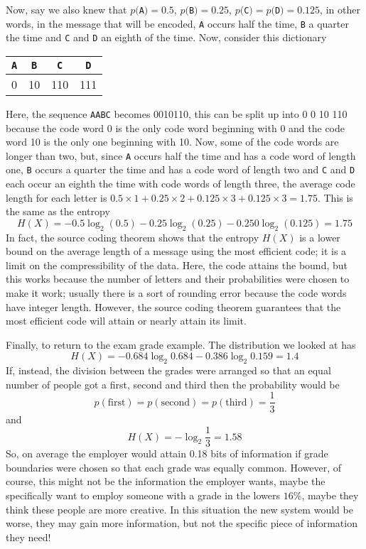 \documentclass[12pt]{article}
\begin{document}
Now, say we also knew that $p($\texttt{A}$)=0.5$, $p($\texttt{B}$)=0.25$,
$p($\texttt{C}$)=p($\texttt{D}$)=0.125$, in other words, in the message that will be
encoded, \texttt{A} occurs half the time, \texttt{B} a quarter the time and \texttt{C} and \texttt{D} an
eighth of the time. Now, consider this dictionary
\begin{center}
\begin{tabular}{cccc}
\texttt{A}&\texttt{B}&\texttt{C}&\texttt{D}\\
\hline
0&10&110&111
\end{tabular}
\end{center}
Here, the sequence \texttt{AABC} becomes 0010110, this can be split up into 0
0 10 110 because the code word 0 is the only code word beginning
with 0 and the code word 10 is the only one beginning with 10. Now,
some of the code words are longer than two, but, since \texttt{A} occurs half
the time and has a code word of length one, \texttt{B} occurs a quarter the
time and has a code word of length two and \texttt{C} and \texttt{D} each occur an
eighth the time with code words of length three, the average code
length for each letter is $0.5\times 1 +0.25\times 2 + 0.125\times 3 +
0.125\times 3=1.75$. This is the same as the entropy
\begin{equation}
H(X)=-0.5\log_2(0.5)-0.25\log_2(0.25)-0.250\log_2(0.125)=1.75
\end{equation}
In fact, the source coding theorem shows that the entropy $H(X)$ is
a lower bound on the average length of a message using the most
efficient code; it is a limit on the compressibility of the
data. Here, the code attains the bound, but this works because the
number of letters and their probabilities were chosen to make it work;
usually there is a sort of rounding error because the code words have
integer length. However, the source coding theorem guarantees that the
most efficient code will attain or nearly attain its limit.

Finally, to return to the exam grade example. The distribution we looked at has
\begin{equation}
H(X)=-0.684\log_2{0.684}-0.386\log_2{0.159}=1.4
\end{equation}
If, instead, the division between the grades were arranged so that an equal number of people got a first, second and third then the probability would be 
\begin{equation}
p(\mbox{first})=p(\mbox{second})=p(\mbox{third})=\frac{1}{3}
\end{equation}
and
\begin{equation}
H(X)=-\log_2\frac{1}{3}=1.58
\end{equation}
So, on average the employer would attain 0.18 bits of information if
grade boundaries were chosen so that each grade was equally
common. However, of course, this might not be the information the
employer wants, maybe the specifically want to employ someone with a
grade in the lowers $16\%$, maybe they think these people are more
creative. In this situation the new system would be worse, they may
gain more information, but not the specific piece of information they
need!
\end{document}
